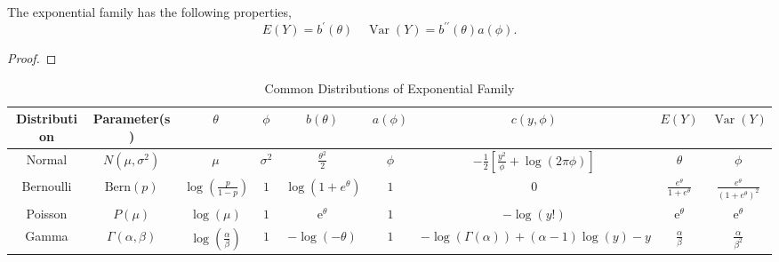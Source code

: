 \begin{property}
	The exponential family has the following properties,
	\begin{equation*}
		E(Y)=b^{\prime}(\theta)\quad\operatorname{Var}(Y)=b^{\prime\prime}(\theta)a(\phi).
	\end{equation*}
\end{property}

\begin{proof}

\end{proof}

\begin{landscape}
	\begin{table}[hpt]
		\centering
		\caption{Common Distributions of Exponential Family}
		\begin{tabular}{ccccccccc}
			\toprule
			Distribution & Parameter(s)           & $\theta$                                & $\phi$       & $b(\theta)$                     & $a(\phi)$ & $c(y,\phi)$                                                   & $E(Y)$                            & $\operatorname{Var}(Y)$                            \\
			\midrule
			Normal       & $N(\mu,\sigma^2)$      & $\mu$                                   & $\sigma^{2}$ & $\frac{\theta^{2}}{2}$          & $\phi$    & $-\frac{1}{2}\left[\frac{y^{2}}{\phi}+\log (2\pi\phi)\right]$ & $\theta$                          & $\phi$                                             \\
			Bernoulli    & $\text{Bern}(p)$       & $\log\left(\frac{p}{1-p}\right)$        & $1$          & $\log\left(1+e^{\theta}\right)$ & $1$       & $0$                                                           & $\frac{e^{\theta}}{1+e^{\theta}}$ & $\frac{e^{\theta}}{\left(1+e^{\theta}\right)^{2}}$ \\
			Poisson      & $P(\mu)$               & $\log(\mu)$                             & $1$          & $\mathrm{e}^{\theta}$           & $1$       & $-\log(y!)$                                                   & $\mathrm{e}^{\theta}$             & $\mathrm{e}^{\theta}$                              \\
			Gamma        & $\Gamma(\alpha,\beta)$ & $\log\left(\frac{\alpha}{\beta}\right)$ & $1$          & $-\log(-\theta)$                & $1$       & $-\log\left(\Gamma(\alpha)\right)+(\alpha-1)\log(y)-y$        & $\frac{\alpha}{\beta}$            & $\frac{\alpha}{\beta^{2}}$                         \\
			\bottomrule
		\end{tabular}
	\end{table}
\end{landscape}

